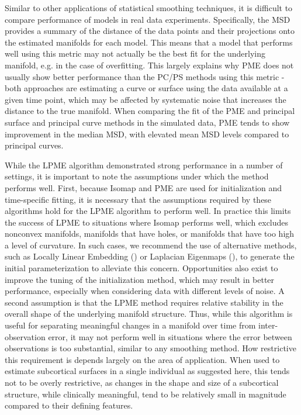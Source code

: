 \documentclass[12pt]{article}
\theoremstyle{definition}
\begin{document}
Similar to other applications of statistical smoothing techniques, it is difficult to compare performance of models in real data experiments. Specifically, the MSD provides a summary of the distance of the data points and their projections onto the estimated manifolds for each model. This means that a model that performs well using this metric may not actually be the best fit for the underlying manifold, e.g. in the case of overfitting. This largely explains why PME does not usually show better performance than the PC/PS methods using this metric - both approaches are estimating a curve or surface using the data available at a given time point, which may be affected by systematic noise that increases the distance to the true manifold. When comparing the fit of the PME and principal surface and principal curve methods in the simulated data, PME tends to show improvement in the median MSD, with elevated mean MSD levels compared to principal curves.

While the LPME algorithm demonstrated strong performance in a number of settings, it is important to note the assumptions under which the method performs well. First, because Isomap and PME are used for initialization and time-specific fitting, it is necessary that the assumptions required by these algorithms hold for the LPME algorithm to perform well. In practice this limits the success of LPME to situations where Isomap performs well, which excludes nonconvex manifolds, manifolds that have holes, or manifolds that have too high a level of curvature. In such cases, we recommend the use of alternative methods, such as Locally Linear Embedding (\cite{roweisNonlinearDimensionalityReduction2000}) or Laplacian Eigenmaps (\cite{belkin2003laplacian}), to generate the initial parameterization to alleviate this concern. Opportunities also exist to improve the tuning of the initialization method, which may result in better performance, especially when considering data with different levels of noise. A second assumption is that the LPME method requires relative stability in the overall shape of the underlying manifold structure. Thus, while this algorithm is useful for separating meaningful changes in a manifold over time from inter-observation error, it may not perform well in situations where the error between observations is too substantial, similar to any smoothing method. How restrictive this requirement is depends largely on the area of application. When used to estimate subcortical surfaces in a single individual as suggested here, this tends not to be overly restrictive, as changes in the shape and size of a subcortical structure, while clinically meaningful, tend to be relatively small in magnitude compared to their defining features.
\end{document}
